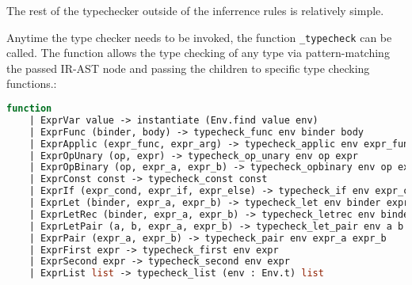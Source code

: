 \documentclass{l4proj}
\begin{document}
The rest of the typechecker outside of the inferrence rules is relatively simple.

Anytime the type checker needs to be invoked, the function \texttt{\_typecheck} can be called.
The function allows the type checking of any type via pattern-matching the passed IR-AST node and passing the children to specific type checking functions.:

\begin{lstlisting}[language=Caml, caption=The body of PyFunc's main type check function\, which defers to other more specific type checking functions via patter-matching.]
function
    | ExprVar value -> instantiate (Env.find value env)
    | ExprFunc (binder, body) -> typecheck_func env binder body
    | ExprApplic (expr_func, expr_arg) -> typecheck_applic env expr_func expr_arg
    | ExprOpUnary (op, expr) -> typecheck_op_unary env op expr
    | ExprOpBinary (op, expr_a, expr_b) -> typecheck_opbinary env op expr_a expr_b
    | ExprConst const -> typecheck_const const
    | ExprIf (expr_cond, expr_if, expr_else) -> typecheck_if env expr_cond expr_if expr_else
    | ExprLet (binder, expr_a, expr_b) -> typecheck_let env binder expr_a expr_b
    | ExprLetRec (binder, expr_a, expr_b) -> typecheck_letrec env binder expr_a expr_b
    | ExprLetPair (a, b, expr_a, expr_b) -> typecheck_let_pair env a b expr_a expr_b
    | ExprPair (expr_a, expr_b) -> typecheck_pair env expr_a expr_b
    | ExprFirst expr -> typecheck_first env expr
    | ExprSecond expr -> typecheck_second env expr
    | ExprList list -> typecheck_list (env : Env.t) list
\end{lstlisting}
\end{document}
